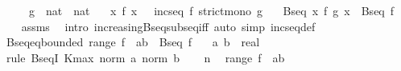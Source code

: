 \begin{isabellebody}
\ \ \ \ \ g\ {\isacharcolon}{\kern0pt}{\isacharcolon}{\kern0pt}\ {\isachardoublequoteopen}nat\ {\isasymRightarrow}\ nat{\isachardoublequoteclose}\isanewline
\ \ \ {\isachardoublequoteopen}{\isasymAnd}x{\isachardot}{\kern0pt}\ f\ x\ {\isasymge}\ {}{\isachardoublequoteclose}\ {\isachardoublequoteopen}incseq\ f{\isachardoublequoteclose}\ {\isachardoublequoteopen}strict{\isacharunderscore}{\kern0pt}mono\ g{\isachardoublequoteclose}\isanewline
\ \ \ {\isachardoublequoteopen}Bseq\ {\isacharparenleft}{\kern0pt}{\isasymlambda}x{\isachardot}{\kern0pt}\ f\ {\isacharparenleft}{\kern0pt}g\ x{\isacharparenright}{\kern0pt}{\isacharparenright}{\kern0pt}\ {\isasymlongleftrightarrow}\ Bseq\ f{\isachardoublequoteclose}\isanewline
%
\isadelimproof
\ \ %
\endisadelimproof
%
\isatagproof
{}\isamarkupfalse%
\ assms\ \isamarkupfalse%
\ {\isacharparenleft}{\kern0pt}intro\ increasing{\isacharunderscore}{\kern0pt}Bseq{\isacharunderscore}{\kern0pt}subseq{\isacharunderscore}{\kern0pt}iff{\isacharparenright}{\kern0pt}\ {\isacharparenleft}{\kern0pt}auto\ simp{\isacharcolon}{\kern0pt}\ incseq{\isacharunderscore}{\kern0pt}def{\isacharparenright}{\kern0pt}%
\endisatagproof
{\isafoldproof}%
%
\isadelimproof
\isanewline
%
\endisadelimproof
\isanewline
{}\isamarkupfalse%
\ Bseq{\isacharunderscore}{\kern0pt}eq{\isacharunderscore}{\kern0pt}bounded{\isacharcolon}{\kern0pt}\ {\isachardoublequoteopen}range\ f\ {\isasymsubseteq}\ {\isacharbraceleft}{\kern0pt}a{\isachardot}{\kern0pt}{\isachardot}{\kern0pt}b{\isacharbraceright}{\kern0pt}\ {\isasymLongrightarrow}\ Bseq\ f{\isachardoublequoteclose}\isanewline
\ \ \ a\ b\ {\isacharcolon}{\kern0pt}{\isacharcolon}{\kern0pt}\ real\isanewline
%
\isadelimproof
%
\endisadelimproof
%
\isatagproof
{}\isamarkupfalse%
\ {\isacharparenleft}{\kern0pt}rule\ BseqI{\isacharprime}{\kern0pt}{\isacharbrackleft}{\kern0pt}\ K{\isacharequal}{\kern0pt}{\isachardoublequoteopen}max\ {\isacharparenleft}{\kern0pt}norm\ a{\isacharparenright}{\kern0pt}\ {\isacharparenleft}{\kern0pt}norm\ b{\isacharparenright}{\kern0pt}{\isachardoublequoteclose}{\isacharbrackright}{\kern0pt}{\isacharparenright}{\kern0pt}\isanewline
\ \ \isamarkupfalse%
\ n\ \isamarkupfalse%
\ {\isachardoublequoteopen}range\ f\ {\isasymsubseteq}\ {\isacharbraceleft}{\kern0pt}a{\isachardot}{\kern0pt}{\isachardot}{\kern0pt}b{\isacharbraceright}{\kern0pt}{\isachardoublequoteclose}\isanewline
\ \ \isamarkupfalse%

\end{isabellebody}

